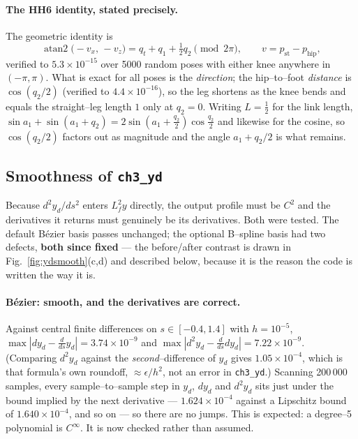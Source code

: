 \documentclass[11pt,a4paper]{article}
\newcommand{\code}[1]{\texttt{#1}}          %
\begin{document}
\paragraph{The HH6 identity, stated precisely.}
The geometric identity is
\begin{equation}
  \operatorname{atan2}\!\big(-v_x,\,-v_z\big) = q_t + q_1 + \tfrac12 q_2
  \pmod{2\pi},
  \qquad v = p_{\mathrm{st}} - p_{\mathrm{hip}},
\end{equation}
verified to $5.3\times10^{-15}$ over 5000 random poses with either knee anywhere
in $(-\pi,\pi)$. What is exact for all poses is the \emph{direction}; the
hip--to--foot \emph{distance} is $\cos(q_2/2)$ (verified to $4.4\times10^{-16}$),
so the leg shortens as the knee bends and equals the straight--leg length $1$
only at $q_2=0$. Writing $L=\tfrac12$ for the link length,
$\sin a_1 + \sin(a_1{+}q_2) = 2\sin(a_1{+}\tfrac{q_2}{2})\cos\tfrac{q_2}{2}$ and
likewise for the cosine, so $\cos(q_2/2)$ factors out as magnitude and the angle
$a_1 + q_2/2$ is what remains.

\subsection{Smoothness of \code{ch3\_yd}}
\label{sec:ydsmooth}
Because $d^2y_d/ds^2$ enters $L_f^2y$ directly, the output profile must be $C^2$
and the derivatives it returns must genuinely be its derivatives. Both were
tested. The default B\'ezier basis passes unchanged; the optional B--spline
basis had two defects, \textbf{both since fixed} --- the before/after contrast
is drawn in Fig.~\ref{fig:ydsmooth}(c,d) and described below, because it is the
reason the code is written the way it is.

\paragraph{B\'ezier: smooth, and the derivatives are correct.}
Against central finite differences on $s\in[-0.4,1.4]$ with $h=10^{-5}$,
$\max|dy_d - \tfrac{d}{ds}y_d| = 3.74\times10^{-9}$ and
$\max|d^2y_d - \tfrac{d}{ds}dy_d| = 7.22\times10^{-9}$. (Comparing $d^2y_d$
against the \emph{second}--difference of $y_d$ gives $1.05\times10^{-4}$, which is
that formula's own roundoff, $\approx\epsilon/h^2$, not an error in
\code{ch3\_yd}.) Scanning 200\,000 samples, every sample--to--sample step in
$y_d$, $dy_d$ and $d^2y_d$ sits just under the bound implied by the next
derivative --- $1.624\times10^{-4}$ against a Lipschitz bound of
$1.640\times10^{-4}$, and so on --- so there are no jumps. This is expected: a
degree--5 polynomial is $C^\infty$. It is now checked rather than assumed.
\end{document}

